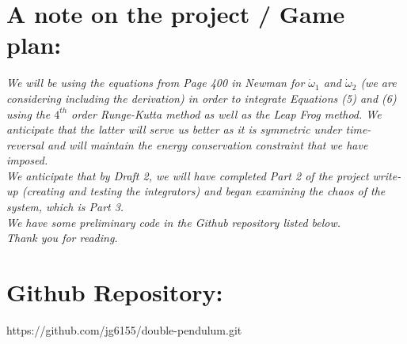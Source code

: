 \documentclass{article}
\begin{document}
\section*{A note on the project / Game plan:}
\textit{We will be using the equations from Page 400 in Newman for $\dot{\omega}_1$ and $\dot{\omega}_2$ (we are considering including the derivation) in order to integrate Equations (5) and (6) using the $4^{th}$ order Runge-Kutta method as well as the Leap Frog method. We anticipate that the latter will serve us better as it is symmetric under time-reversal and will maintain the energy conservation constraint that we have imposed.
\\We anticipate that by Draft 2, we will have completed Part 2 of the project write-up (creating and testing the integrators) and began examining the chaos of the system, which is Part 3.
\\We have some preliminary code in the Github repository listed below.
\\Thank you for reading.}

\section{Github Repository:}
https://github.com/jg6155/double-pendulum.git
\end{document}

